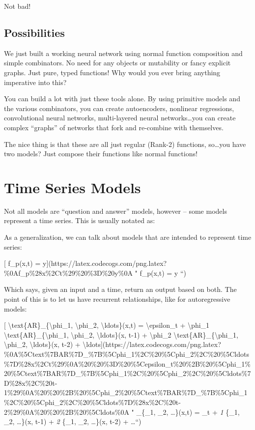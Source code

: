 \documentclass[]{article}
\begin{document}
Not bad!

\hypertarget{possibilities}{%
\subsection{Possibilities}\label{possibilities}}

We just built a working neural network using normal function composition and
simple combinators. No need for any objects or mutability or fancy explicit
graphs. Just pure, typed functions! Why would you ever bring anything imperative
into this?

You can build a lot with just these tools alone. By using primitive models and
the various combinators, you can create autoencoders, nonlinear regressions,
convolutional neural networks, multi-layered neural networks\ldots{}you can
create complex ``graphs'' of networks that fork and re-combine with themselves.

The nice thing is that these are all just regular (Rank-2) functions,
so\ldots{}you have two models? Just compose their functions like normal
functions!

\hypertarget{time-series-models}{%
\section{Time Series Models}\label{time-series-models}}

Not all models are ``question and answer'' models, however -- some models
represent a time series. This is usually notated as:

As a generalization, we can talk about models that are intended to represent
time series:

{[} f\_p(x,t) =
y{]}(https://latex.codecogs.com/png.latex?\%0Af\_p\%28x\%2Ct\%29\%20\%3D\%20y\%0A
" f\_p(x,t) = y ``)

Which says, given an input and a time, return an output based on both. The point
of this is to let us have recurrent relationships, like for autoregressive
models:

{[} \textbackslash{}text\{AR\}\_\{\textbackslash{}phi\_1,
\textbackslash{}phi\_2, \textbackslash{}ldots\}(x,t) =
\textbackslash{}epsilon\_t + \textbackslash{}phi\_1
\textbackslash{}text\{AR\}\_\{\textbackslash{}phi\_1, \textbackslash{}phi\_2,
\textbackslash{}ldots\}(x, t-1) + \textbackslash{}phi\_2
\textbackslash{}text\{AR\}\_\{\textbackslash{}phi\_1, \textbackslash{}phi\_2,
\textbackslash{}ldots\}(x, t-2) +
\textbackslash{}ldots{]}(https://latex.codecogs.com/png.latex?\%0A\%5Ctext\%7BAR\%7D\_\%7B\%5Cphi\_1\%2C\%20\%5Cphi\_2\%2C\%20\%5Cldots\%7D\%28x\%2Ct\%29\%0A\%20\%20\%3D\%20\%5Cepsilon\_t\%20\%2B\%20\%5Cphi\_1\%20\%5Ctext\%7BAR\%7D\_\%7B\%5Cphi\_1\%2C\%20\%5Cphi\_2\%2C\%20\%5Cldots\%7D\%28x\%2C\%20t-1\%29\%0A\%20\%20\%2B\%20\%5Cphi\_2\%20\%5Ctext\%7BAR\%7D\_\%7B\%5Cphi\_1\%2C\%20\%5Cphi\_2\%2C\%20\%5Cldots\%7D\%28x\%2C\%20t-2\%29\%0A\%20\%20\%2B\%20\%5Cldots\%0A
" \_\{\phi\_1, \phi\_2, \ldots\}(x,t) = \epsilon\_t + \phi\emph{1
}\{\phi\_1, \phi\_2, \ldots\}(x, t-1) + \phi\emph{2
}\{\phi\_1, \phi\_2, \ldots\}(x, t-2) + \ldots ``)
\end{document}
